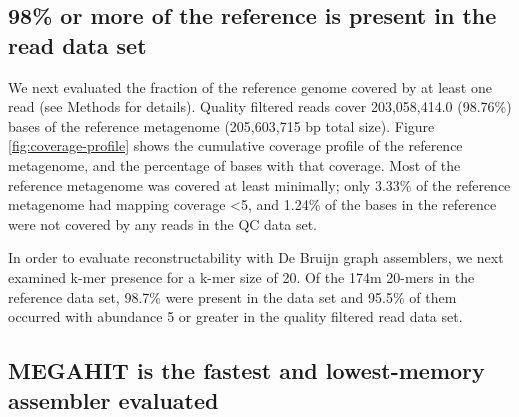 \documentclass[10pt,a4paper,twocolumn]{article}
\begin{document}


\subsection*{98\% or more of the reference is present in the read data set}

We next evaluated the fraction of the reference genome covered by at least
one read (see Methods for details). Quality filtered reads cover
203,058,414.0 (98.76\%) bases of the reference metagenome (205,603,715
bp total size).  Figure \ref{fig:coverage-profile} shows the
cumulative coverage profile of the reference metagenome, and the
percentage of bases with that coverage. Most of the reference
metagenome was covered at least minimally; only 3.33\% of the
reference metagenome had mapping coverage \textless 5, and 1.24\% of
the bases in the reference were not covered by any reads in the QC data
set.

In order to evaluate reconstructability with De Bruijn graph
assemblers, we next examined k-mer presence for a k-mer size of 20. Of
the 174m 20-mers in the reference data set, 98.7\% were present in the
data set and 95.5\% of them occurred with abundance 5 or greater in
the quality filtered read data set.


\subsection*{MEGAHIT is the fastest and lowest-memory assembler evaluated}
\end{document}
